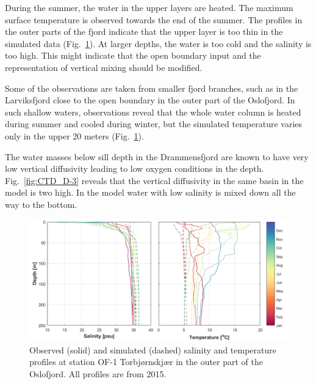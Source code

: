 During the summer, the water in the upper layers are heated. 
The maximum surface temperature is observed towards the end of the summer. 
The profiles in the outer parts of the fjord indicate that the upper layer is too thin in the simulated data (Fig.~\ref{fig:CTD_OF-1}). 
At larger depths, the water is too cold and the salinity is too high. 
This might indicate that the open boundary input and the representation of vertical mixing should be modified. 

Some of the observations are taken from smaller fjord branches, such as in the Larviksfjord close to the open boundary in the outer part of the Oslofjord. 
In such shallow waters, observations reveal that the whole water column is heated during summer and cooled during winter, but the simulated temperature varies only in the upper 20 meters (Fig.~\ref{fig:CTD_OF-1}). 

The water masses below sill depth in the Drammensfjord are known to have very low vertical diffusivity leading to low oxygen conditions in the depth.
Fig.~\ref{fig:CTD_D-3} reveals that the vertical diffusivity in the same basin in the model is two high.
In the model water with low salinity is mixed down all the way to the bottom. 

\begin{figure}[tbh]
\centerline{
\includegraphics*[trim=0cm 0cm 0cm 0cm,clip=true,width=\textwidth]{Figurer/CTD_OF-1}}
\caption{\small
Observed (solid) and simulated (dashed) salinity and temperature profiles at station OF-1 Torbj{\o}rnskj{\ae}r in the outer part of the Oslofjord. All profiles are from 2015.}
\label{fig:CTD_OF-1}
\end{figure}

